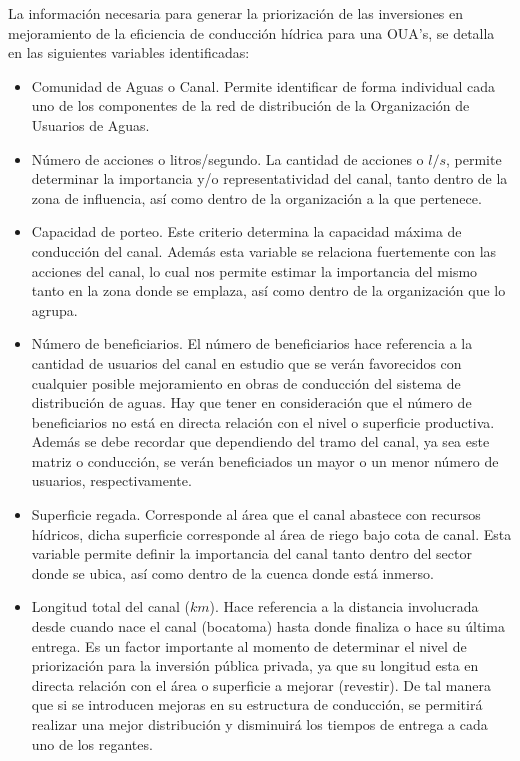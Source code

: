 \documentclass[]{article}
\begin{document}
La información necesaria para generar la priorización de las inversiones en mejoramiento de la eficiencia de conducción hídrica para una OUA's, se detalla en las siguientes variables identificadas:

\begin{itemize}
\item Comunidad de Aguas o Canal. Permite identificar de forma individual cada uno de los componentes de la red de distribución de la Organización de Usuarios de Aguas.
\item Número de acciones o litros/segundo. La cantidad de acciones o $l/s$, permite determinar la importancia y/o representatividad del canal, tanto dentro de la zona de influencia, así como dentro de la organización a la que pertenece.
\item Capacidad de porteo. Este criterio determina la capacidad máxima de conducción del canal. Además esta variable se relaciona fuertemente con las acciones del canal, lo cual nos permite estimar la importancia del mismo tanto en la zona donde se emplaza, así como dentro de la organización que lo agrupa.
\item Número de beneficiarios. El número de beneficiarios hace referencia a la cantidad de usuarios del canal en estudio que se verán favorecidos con cualquier posible mejoramiento en obras de conducción del sistema de distribución de aguas. Hay que tener en consideración que el número de beneficiarios no está en directa relación con el nivel o superficie productiva. Además se debe recordar que dependiendo del tramo del canal, ya sea este matriz o conducción, se verán beneficiados un mayor o un menor número de usuarios, respectivamente.
\item Superficie regada. Corresponde al área que el canal abastece con recursos hídricos, dicha superficie corresponde al área de riego bajo cota de canal. Esta variable permite definir la importancia del canal tanto dentro del sector donde se ubica, así como dentro de la cuenca donde está inmerso.
\item Longitud total del canal ($km$). Hace referencia a la distancia involucrada desde cuando nace el canal (bocatoma) hasta donde finaliza o hace su última entrega. Es un factor importante al momento de determinar el nivel de priorización para la inversión pública privada, ya que su longitud esta en directa relación con el área o superficie a mejorar (revestir). De tal manera que si se introducen mejoras en su estructura de conducción, se permitirá realizar una mejor distribución y disminuirá los tiempos de entrega a cada uno de los regantes.

\end{itemize}
\end{document}
